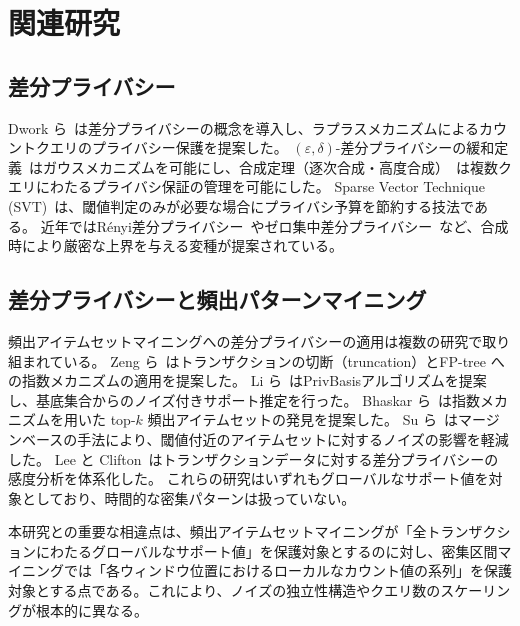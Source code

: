 \section{関連研究}\label{sec:related}

\subsection{差分プライバシー}

Dwork ら~\cite{dwork2006calibrating}は差分プライバシーの概念を導入し、ラプラスメカニズムによるカウントクエリのプライバシー保護を提案した。
$(\varepsilon, \delta)$-差分プライバシーの緩和定義~\cite{dwork2014algorithmic}はガウスメカニズムを可能にし、合成定理（逐次合成・高度合成）~\cite{dwork2010boosting,kairouz2015composition}は複数クエリにわたるプライバシ保証の管理を可能にした。
Sparse Vector Technique (SVT)~\cite{dwork2009complexity,hardt2010simple,lyu2017understanding}は、閾値判定のみが必要な場合にプライバシ予算を節約する技法である。
近年ではR\'{e}nyi差分プライバシー~\cite{mironov2017renyi}やゼロ集中差分プライバシー~\cite{bun2016concentrated}など、合成時により厳密な上界を与える変種が提案されている。

\subsection{差分プライバシーと頻出パターンマイニング}

頻出アイテムセットマイニングへの差分プライバシーの適用は複数の研究で取り組まれている。
Zeng ら~\cite{zeng2012differentially}はトランザクションの切断（truncation）とFP-tree への指数メカニズムの適用を提案した。
Li ら~\cite{li2012privbasis}はPrivBasisアルゴリズムを提案し、基底集合からのノイズ付きサポート推定を行った。
Bhaskar ら~\cite{bhaskar2010discovering}は指数メカニズムを用いた top-$k$ 頻出アイテムセットの発見を提案した。
Su ら~\cite{su2016differentially}はマージンベースの手法により、閾値付近のアイテムセットに対するノイズの影響を軽減した。
Lee と Clifton~\cite{lee2011how}はトランザクションデータに対する差分プライバシーの感度分析を体系化した。
これらの研究はいずれもグローバルなサポート値を対象としており、時間的な密集パターンは扱っていない。

本研究との重要な相違点は、頻出アイテムセットマイニングが「全トランザクションにわたるグローバルなサポート値」を保護対象とするのに対し、密集区間マイニングでは「各ウィンドウ位置におけるローカルなカウント値の系列」を保護対象とする点である。これにより、ノイズの独立性構造やクエリ数のスケーリングが根本的に異なる。

